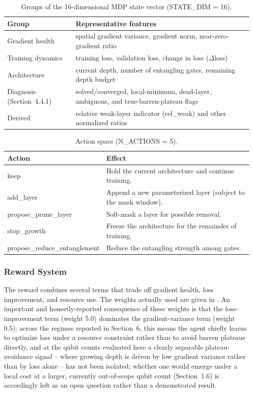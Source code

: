 \begin{table}[htbp]
\centering
\caption{Groups of the 16-dimensional MDP state vector (STATE\_DIM = 16).}
\label{tab:state}
\begin{tabular}{|p{3cm}|p{10cm}|}
\hline
\textbf{Group} & \textbf{Representative features} \\
\hline
Gradient health & spatial gradient variance, gradient norm, near-zero-gradient ratio \\
Training dynamics & training loss, validation loss, change in loss ($\Delta$loss) \\
Architecture & current depth, number of entangling gates, remaining depth budget \\
Diagnosis (Section~4.4.1) & solved/converged, local-minimum, dead-layer, ambiguous, and true-barren-plateau flags \\
Derived & relative weak-layer indicator (rel\_weak) and other normalized ratios \\
\hline
\end{tabular}
\end{table}

\begin{table}[htbp]
\centering
\caption{Action space (N\_ACTIONS = 5).}
\label{tab:actions}
\begin{tabular}{|p{4.5cm}|p{8.5cm}|}
\hline
\textbf{Action} & \textbf{Effect} \\
\hline
keep & Hold the current architecture and continue training. \\
add\_layer & Append a new parameterized layer (subject to the mask window). \\
propose\_prune\_layer & Soft-mask a layer for possible removal. \\
stop\_growth & Freeze the architecture for the remainder of training. \\
propose\_reduce\_entanglement & Reduce the entangling strength among gates. \\
\hline
\end{tabular}
\end{table}

\subsubsection{Reward System}
The reward combines several terms that trade off gradient health, loss improvement, and resource use. The weights actually used are given in . An important and honestly-reported consequence of these weights is that the loss-improvement term (weight 5.0) dominates the gradient-variance term (weight 0.5): across the regimes reported in Section~6, this means the agent chiefly learns to optimize loss under a resource constraint rather than to avoid barren plateaus directly, and at the qubit counts evaluated here a clearly separable plateau-avoidance signal -- where growing depth is driven by low gradient variance rather than by loss alone -- has not been isolated; whether one would emerge under a local cost at a larger, currently out-of-scope qubit count (Section~1.6) is accordingly left as an open question rather than a demonstrated result.

